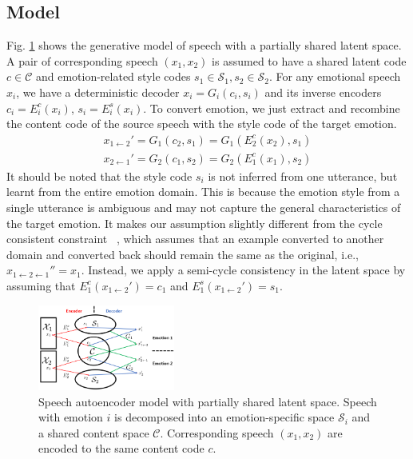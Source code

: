 \documentclass{article}
\begin{document}
\subsection{Model}
Fig. \ref{autoencoder} shows the generative model of speech with a partially shared latent space. A pair of corresponding speech $(x_1, x_2)$ is assumed to have a shared latent code $c \in \mathcal{C}$ and emotion-related style codes $s_1 \in \mathcal{S}_1, s_2 \in \mathcal{S}_2$. For any emotional speech $x_i$, we have a deterministic decoder $x_i = G_i(c_i,s_i)$ and its inverse encoders $c_i = E_i^c(x_i)$, $s_i = E_i^s(x_i)$. To convert emotion, we just extract and recombine the content code of the source speech with the style code of the target emotion.
\begin{equation}
\begin{aligned}
x_{1\leftarrow2}' = G_1(c_2, s_1) = G_1(E_2^c(x_2), s_1) \\
x_{2\leftarrow1}' = G_2(c_1, s_2) = G_2(E_1^c(x_1), s_2)
\end{aligned}
\end{equation}
It should be noted that the style code $s_i$ is not inferred from one utterance, but learnt from the entire emotion domain. This is because the emotion style from a single utterance is ambiguous and may not capture the general characteristics of the target emotion. It makes our assumption slightly different from the cycle consistent constraint ~\cite{Zhu_2017_ICCV}, which assumes that an example converted to another domain and converted back should remain the same as the original, i.e., $x_{1\leftarrow2\leftarrow1}'' = x_1$. Instead, we apply a semi-cycle consistency in the latent space by assuming that $E_1^c(x_{1\leftarrow2}') = c_1$ and $E_1^s(x_{1\leftarrow2}') = s_1$.

\begin{figure}[htb]
\center
\includegraphics[width=0.4\textwidth]{FIG/autoencoder}
\caption{Speech autoencoder model with partially shared latent space. Speech with emotion $i$ is decomposed into an emotion-specific space $\mathcal{S}_i$ and a shared content space $\mathcal{C}$. Corresponding speech $(x_1,x_2)$ are encoded to the same content code $c$.
}
\label{autoencoder}
\end{figure}
\end{document}
